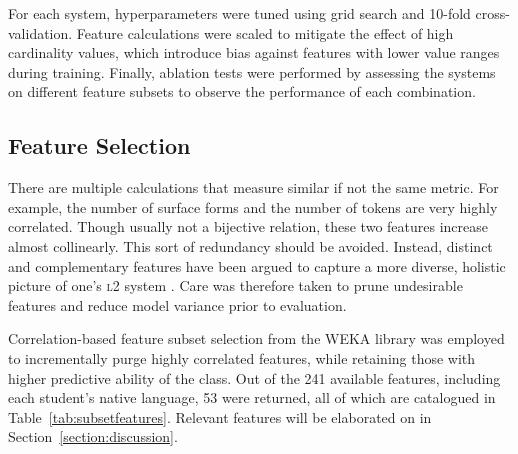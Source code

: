 For each system, hyperparameters were tuned using grid search and 10-fold cross-validation. Feature calculations were scaled to mitigate the effect of high cardinality values, which introduce bias against features with lower value ranges during training. Finally, ablation tests were performed by assessing the systems on different feature subsets to observe the performance of each combination.

\subsection{Feature Selection}

There are multiple calculations that measure similar if not the same metric. For example, the number of surface forms and the number of tokens are very highly correlated. Though usually not a bijective relation, these two features increase almost collinearly. This sort of redundancy should be avoided. Instead, distinct and complementary features have been argued to capture a more diverse, holistic picture of one's {\scshape l2} system \citep{norris2009}. Care was therefore taken to prune undesirable features and reduce model variance prior to evaluation.

Correlation-based feature subset selection \citep[CfsSubsetEval;][]{hall1998} from the WEKA library \citep{weka} was employed to incrementally purge highly correlated features, while retaining those with higher predictive ability of the class. Out of the 241 available features, including each student's native language, 53 were returned, all of which are catalogued in Table~\ref{tab:subsetfeatures}. Relevant features will be elaborated on in Section~\ref{section:discussion}.

